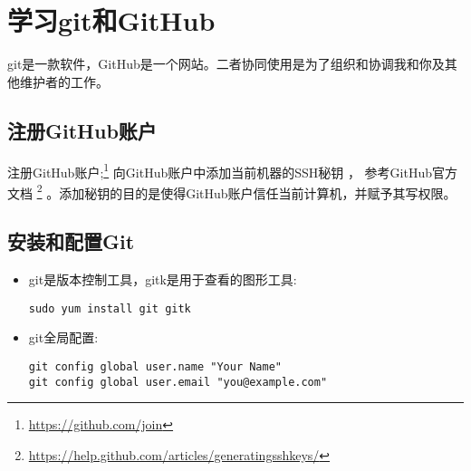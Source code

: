 \section{学习git和GitHub}
git是一款软件，GitHub是一个网站。二者协同使用是为了组织和协调我和你及其他维护者的工作。
\subsection{注册GitHub账户}
注册GitHub账户;\footnote{\url{https://github.com/join}}
向GitHub账户中添加当前机器的SSH秘钥 ， 参考GitHub官方文档
\footnote{\url{https://help.github.com/articles/generating­ssh­keys/}}
。添加秘钥的目的是使得GitHub账户信任当前计算机，并赋予其写权限。
\subsection{安装和配置Git}
\begin{itemize}
\item git是版本控制工具，gitk是用于查看的图形工具:
\begin{verbatim}
sudo yum install git gitk
\end{verbatim}
\item git全局配置:
\begin{verbatim}
git config ­­global user.name "Your Name"
git config ­­global user.email "you@example.com"
\end{verbatim}
\end{itemize}
